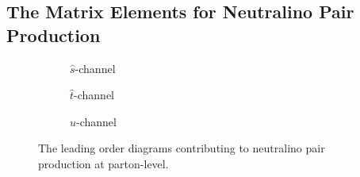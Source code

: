 \documentclass[../main.tex]{subfiles}
\begin{document}
\subsection{The Matrix Elements for Neutralino Pair Production}
\begin{figure} [ht!]
  \centering
  \begin{subfigure}{0.3\linewidth}
    \centering
    \caption{\(\hat{s}\)-channel}
    \label{pc:subfig:tree_level_s-channel}
  \end{subfigure}
  \begin{subfigure}{0.3\linewidth}
    \centering
    \caption{\(\hat{t}\)-channel}
  \end{subfigure}
  \begin{subfigure}{0.3\linewidth}
    \centering
    \caption{\(\hat{u}\)-channel}
  \end{subfigure}
  \caption{The leading order diagrams contributing to neutralino pair
    production at parton-level.}
  \label{pc:fig:tree_level_diagrams}
\end{figure}
\end{document}
